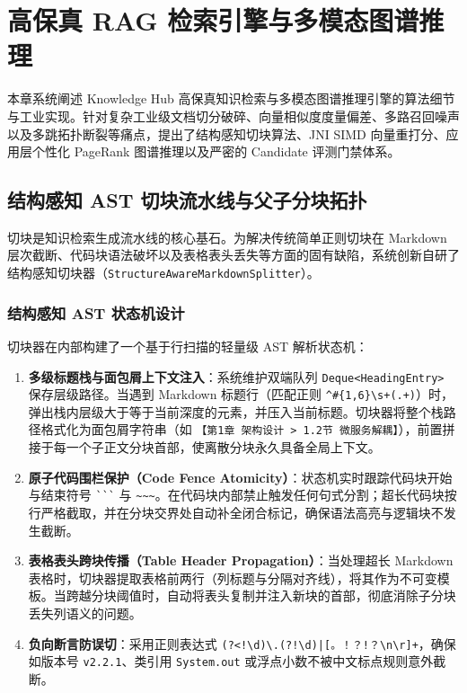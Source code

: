 
\chapter{高保真 RAG 检索引擎与多模态图谱推理}

本章系统阐述 Knowledge Hub 高保真知识检索与多模态图谱推理引擎的算法细节与工业实现。针对复杂工业级文档切分破碎、向量相似度度量偏差、多路召回噪声以及多跳拓扑断裂等痛点，提出了结构感知切块算法、JNI SIMD 向量重打分、应用层个性化 PageRank 图谱推理以及严密的 Candidate 评测门禁体系。

\section{结构感知 AST 切块流水线与父子分块拓扑}

切块是知识检索生成流水线的核心基石。为解决传统简单正则切块在 Markdown 层次截断、代码块语法破坏以及表格表头丢失等方面的固有缺陷，系统创新自研了结构感知切块器（\texttt{Structure\-Aware\-Markdown\-Splitter}）。

\subsection{结构感知 AST 状态机设计}
切块器在内部构建了一个基于行扫描的轻量级 AST 解析状态机：
\begin{enumerate}
    \item \textbf{多级标题栈与面包屑上下文注入}：系统维护双端队列 \texttt{Deque<HeadingEntry>} 保存层级路径。当遇到 Markdown 标题行（匹配正则 \texttt{\^{}\#\{1,6\}\textbackslash s+(.+)}）时，弹出栈内层级大于等于当前深度的元素，并压入当前标题。切块器将整个栈路径格式化为面包屑字符串（如 \texttt{【第1章 架构设计 > 1.2节 微服务解耦】}），前置拼接于每一个子正文分块首部，使离散分块永久具备全局上下文。
    \item \textbf{原子代码围栏保护（Code Fence Atomicity）}：状态机实时跟踪代码块开始与结束符号 \texttt{\`{}\`{}\`} 与 \texttt{\textasciitilde\textasciitilde\textasciitilde}。在代码块内部禁止触发任何句式分割；超长代码块按行严格截取，并在分块交界处自动补全闭合标记，确保语法高亮与逻辑块不发生截断。
    \item \textbf{表格表头跨块传播（Table Header Propagation）}：当处理超长 Markdown 表格时，切块器提取表格前两行（列标题与分隔对齐线），将其作为不可变模板。当跨越分块阈值时，自动将表头复制并注入新块的首部，彻底消除子分块丢失列语义的问题。
    \item \textbf{负向断言防误切}：采用正则表达式 \texttt{(?<!\textbackslash d)\textbackslash.(?!\textbackslash d)|[。！？!？\textbackslash n\textbackslash r]+}，确保如版本号 \texttt{v2.2.1}、类引用 \texttt{System.out} 或浮点小数不被中文标点规则意外截断。
\end{enumerate}

